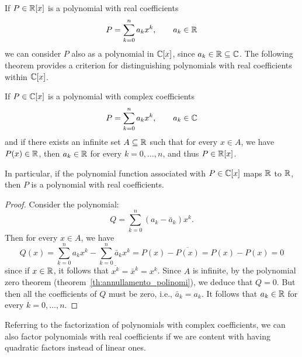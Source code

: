 If $P\in {\mathbb R}[x]$ is a polynomial with real coefficients
\[
  P = \sum_{k=0}^n a_k x^k, \qquad a_k\in {\mathbb R}
\]
we can consider $P$ also as a polynomial in ${\mathbb C}[x]$, since $a_k\in {\mathbb R}\subseteq
{\mathbb C}$.
The following theorem provides a criterion for distinguishing polynomials with
real coefficients within ${\mathbb C}[x]$.

\begin{theorem}
\label{th:caratterizzazione_polinomi_reali}%
If $P\in {\mathbb C}[x]$ is a polynomial with complex coefficients
\[
  P = \sum_{k=0}^n a_k x^k,\qquad a_k\in {\mathbb C}
\]
and if there exists an infinite set $A\subseteq {\mathbb R}$ such that for every $x\in A$,
we have $P(x)\in {\mathbb R}$, then $a_k\in{\mathbb R}$ for every $k=0,\dots,n$, and thus $P\in
{\mathbb R}[x]$.

In particular, if the polynomial function associated with $P\in{\mathbb C}[x]$ maps
${\mathbb R}$ to ${\mathbb R}$, then $P$ is a polynomial with real coefficients.
\end{theorem}
%
\begin{proof}
Consider the polynomial:
\[
  Q = \sum_{k=0}^n (a_k-\bar a_k) x^k.
\]
Then for every $x\in A$, we have
\[
  Q(x) = \sum_{k=0}^n a_k x^k - \sum_{k=0}^n \bar a_k x^k
     = P(x) - \overline{P(x)} = P(x) - P(x) = 0
\]
since if $x\in {\mathbb R}$, it follows that
$\overline{x^k} = {\bar x}^k = x^k$.
Since $A$ is infinite,
by the polynomial zero theorem
(theorem~\ref{th:annullamento_polinomi}),
we deduce that $Q=0$.
But then all the coefficients of $Q$ must
be zero, i.e., $\bar a_k = a_k$.
It follows that $a_k\in {\mathbb R}$ for every $k=0,\dots,n$.
\end{proof}

Referring to the factorization of polynomials with complex coefficients, we can
also factor polynomials with real coefficients if we are content with having
quadratic factors instead of linear ones.


